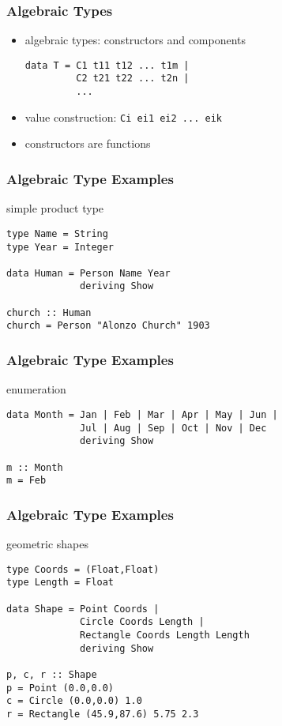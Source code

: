 \documentclass[dvipsnames]{beamer}
\theoremstyle{plain}
\begin{document}
\begin{frame}[fragile]
  \frametitle{Algebraic Types}

  \begin{itemize}
    \item \alert{algebraic types}: constructors and components
    \begin{lstlisting}
data T = C1 t11 t12 ... t1m |
         C2 t21 t22 ... t2n |
         ...
    \end{lstlisting}
    \item value construction: \lstinline{Ci ei1 ei2 ... eik}
    \item constructors are functions
  \end{itemize}
\end{frame}

\begin{frame}[fragile]
  \frametitle{Algebraic Type Examples}

  \begin{exampleblock}{simple product type}
    \begin{lstlisting}
type Name = String
type Year = Integer

data Human = Person Name Year
             deriving Show

church :: Human
church = Person "Alonzo Church" 1903
    \end{lstlisting}
  \end{exampleblock}
\end{frame}

\begin{frame}[fragile]
  \frametitle{Algebraic Type Examples}

  \begin{exampleblock}{enumeration}
    \begin{lstlisting}
data Month = Jan | Feb | Mar | Apr | May | Jun |
             Jul | Aug | Sep | Oct | Nov | Dec
             deriving Show

m :: Month
m = Feb
    \end{lstlisting}
  \end{exampleblock}
\end{frame}

\begin{frame}[fragile]
  \frametitle{Algebraic Type Examples}

  \begin{exampleblock}{geometric shapes}
    \begin{lstlisting}
type Coords = (Float,Float)
type Length = Float

data Shape = Point Coords |
             Circle Coords Length |
             Rectangle Coords Length Length
             deriving Show

p, c, r :: Shape
p = Point (0.0,0.0)
c = Circle (0.0,0.0) 1.0
r = Rectangle (45.9,87.6) 5.75 2.3
    \end{lstlisting}
  \end{exampleblock}
\end{frame}
\end{document}
